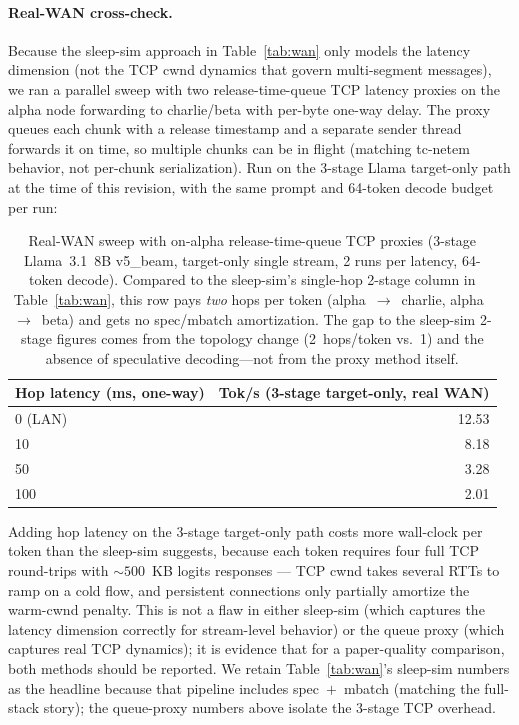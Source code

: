 \documentclass[11pt]{article}
\begin{document}
\paragraph{Real-WAN cross-check.} Because the sleep-sim approach in Table~\ref{tab:wan} only models the latency dimension (not the TCP cwnd dynamics that govern multi-segment messages), we ran a parallel sweep with two release-time-queue TCP latency proxies on the alpha node forwarding to charlie/beta with per-byte one-way delay. The proxy queues each chunk with a release timestamp and a separate sender thread forwards it on time, so multiple chunks can be in flight (matching tc-netem behavior, not per-chunk serialization). Run on the 3-stage Llama target-only path at the time of this revision, with the same prompt and 64-token decode budget per run:

\begin{table}[ht]
\centering
\caption{Real-WAN sweep with on-alpha release-time-queue TCP proxies (3-stage Llama~3.1~8B v5\_beam, target-only single stream, 2 runs per latency, 64-token decode). Compared to the sleep-sim's single-hop 2-stage column in Table~\ref{tab:wan}, this row pays \emph{two} hops per token (alpha~$\to$~charlie, alpha~$\to$~beta) and gets no spec/mbatch amortization. The gap to the sleep-sim 2-stage figures comes from the topology change (2~hops/token vs.\ 1) and the absence of speculative decoding---not from the proxy method itself.}
\label{tab:real_wan}
\begin{tabular}{@{}lr@{}}
\toprule
Hop latency (ms, one-way) & Tok/s (3-stage target-only, real WAN) \\
\midrule
0   (LAN)  & 12.53 \\
10         &  8.18 \\
50         &  3.28 \\
100        &  2.01 \\
\bottomrule
\end{tabular}
\end{table}

Adding hop latency on the 3-stage target-only path costs more wall-clock per token than the sleep-sim suggests, because each token requires four full TCP round-trips with ${\sim}500$~KB logits responses --- TCP cwnd takes several RTTs to ramp on a cold flow, and persistent connections only partially amortize the warm-cwnd penalty. This is not a flaw in either sleep-sim (which captures the latency dimension correctly for stream-level behavior) or the queue proxy (which captures real TCP dynamics); it is evidence that for a paper-quality comparison, both methods should be reported. We retain Table~\ref{tab:wan}'s sleep-sim numbers as the headline because that pipeline includes spec~$+$~mbatch (matching the full-stack story); the queue-proxy numbers above isolate the 3-stage TCP overhead.
\end{document}
